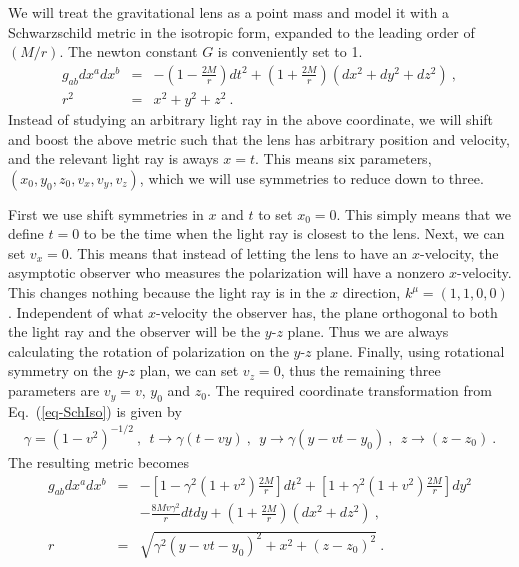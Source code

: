 \documentclass[aps,showpacs,onecolumn,floats,prd,superscriptaddress,nofootinbib]{revtex4}
\begin{document}
We will treat the gravitational lens as a point mass and model it with a Schwarzschild metric in the isotropic form, expanded to the leading order of $(M/r)$. 
The newton constant $G$ is conveniently set to 1.
\begin{eqnarray}
g_{ab}dx^adx^b &=& -\left(1-\frac{2M}{r}\right)dt^2 + \left(1+\frac{2M}{r}\right)\left(dx^2+dy^2+dz^2\right)~, \\
r^2 &=& x^2 + y^2 + z^2~.
\label{eq-SchIso}
\end{eqnarray}
Instead of studying an arbitrary light ray in the above coordinate, we will shift and boost the above metric such that the lens has arbitrary position and velocity, and the relevant light ray is aways $x=t$.
This means six parameters, $(x_0,y_0,z_0,v_x,v_y,v_z)$, which we will use symmetries to reduce down to three.

First we use shift symmetries in $x$ and $t$ to set $x_0=0$. This simply means that we define $t=0$ to be the time when the light ray is closest to the lens.
Next, we can set $v_x=0$. 
This means that instead of letting the lens to have an $x$-velocity, the asymptotic observer who measures the polarization will have a nonzero $x$-velocity. 
This changes nothing because the light ray is in the $x$ direction, $k^\mu = (1,1,0,0)$.
Independent of what $x$-velocity the observer has, the plane orthogonal to both the light ray and the observer will be the $y$-$z$ plane.
Thus we are always calculating the rotation of polarization on the $y$-$z$ plane.
Finally, using rotational symmetry on the $y$-$z$ plan, we can set $v_z=0$, thus the remaining three parameters are $v_y=v$, $y_0$ and $z_0$. The required coordinate transformation from Eq.~(\ref{eq-SchIso}) is given by
\begin{eqnarray}
\gamma = (1-v^2)^{-1/2}~, \ \ t \rightarrow \gamma(t-vy)~, \ \ y\rightarrow \gamma(y-vt-y_0)~, \ \
z\rightarrow (z-z_0)~.
\end{eqnarray}
The resulting metric becomes
\begin{eqnarray}
g_{ab}dx^adx^b &=& -\left[1-\gamma^2(1+v^2)\frac{2M}{r}\right]dt^2   
+ \left[1+\gamma^2(1+v^2)\frac{2M}{r}\right]dy^2 
\label{eq-metric}
\\ \nonumber
& & - \frac{8Mv\gamma^2}{r}dtdy + \left(1+\frac{2M}{r}\right)(dx^2+dz^2)~, \\
r &=& \sqrt{ \gamma^2(y-vt-y_0)^2 + x^2 + (z-z_0)^2 }~.
\end{eqnarray}
\end{document}
